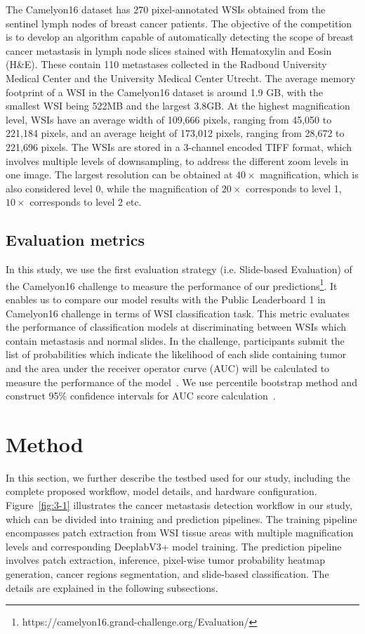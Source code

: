 The Camelyon16 dataset has 270 pixel-annotated WSIs obtained from the sentinel lymph nodes of breast cancer patients. The objective of the competition is to develop an algorithm capable of automatically detecting the scope of breast cancer metastasis in lymph node slices stained with Hematoxylin and Eosin (H\&E). These contain 110 metastases collected in the Radboud University Medical Center and the University Medical Center Utrecht. The average memory footprint of a WSI in the Camelyon16 dataset is around 1.9 GB, with the smallest WSI being 522MB and the largest 3.8GB. At the highest magnification level, WSIs have an average width of 109,666 pixels, ranging from 45,050 to 221,184 pixels, and an average height of 173,012 pixels, ranging from 28,672 to 221,696 pixels. The WSIs are stored in a 3-channel encoded TIFF format, which involves multiple levels of downsampling, to address the different zoom levels in one image. The largest resolution can be obtained at $40\times$ magnification, which is also considered level 0, while the magnification of $20\times$ corresponds to level 1, $10\times$ corresponds to level 2 etc.

\subsection{Evaluation metrics}\label{se:3-2.2}

In this study, we use the first evaluation strategy (i.e. Slide-based Evaluation) of the Camelyon16 challenge to measure the performance of our predictions\footnote[1]{https://camelyon16.grand-challenge.org/Evaluation/}. It enables us to compare our model results with the Public Leaderboard 1 in Camelyon16 challenge in terms of WSI classification task. This metric evaluates the performance of classification models at discriminating between WSIs which contain metastasis and normal slides. In the challenge, participants submit the list of probabilities which indicate the likelihood of each slide containing tumor and the area under the receiver operator curve (AUC) will be calculated to measure the performance of the model~\cite{Bradley1997}. We use percentile bootstrap method and construct 95\% confidence intervals for AUC score calculation~\cite{Efron1979}.

\section{Method}\label{se:3-3}

In this section, we further describe the testbed used for our study, including the complete proposed workflow, model details, and hardware configuration. Figure~\ref{fig:3-1} illustrates  the cancer metastasis detection workflow in our study, which can be divided into training and prediction pipelines. The training pipeline encompasses patch extraction from WSI tissue areas with multiple magnification levels and corresponding DeeplabV3+ model training. The prediction pipeline involves patch extraction, inference, pixel-wise tumor probability heatmap generation, cancer regions segmentation, and slide-based classification. The details are explained in the following subsections.

